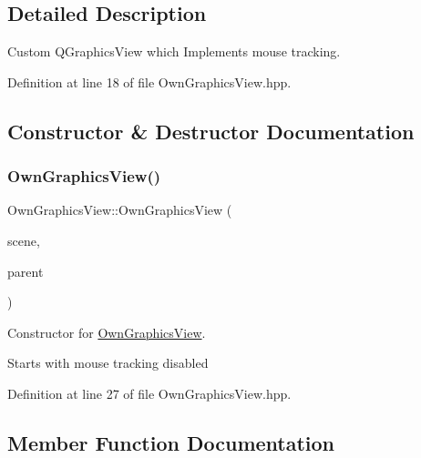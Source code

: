 \subsection{Detailed Description}
Custom Q\+Graphics\+View which Implements mouse tracking. 

Definition at line 18 of file Own\+Graphics\+View.\+hpp.



\subsection{Constructor \& Destructor Documentation}
\mbox{\label{classOwnGraphicsView_a57f2f9617077ce2a1d30ec3f6c7144db}} 
\subsubsection{\texorpdfstring{Own\+Graphics\+View()}{OwnGraphicsView()}}
{\footnotesize\ttfamily Own\+Graphics\+View\+::\+Own\+Graphics\+View (\begin{DoxyParamCaption}\item[{Q\+Graphics\+Scene $\ast$}]{scene,  }\item[{Q\+Widget $\ast$}]{parent }\end{DoxyParamCaption})\hspace{0.3cm}{\ttfamily [inline]}}



Constructor for \mbox{\hyperlink{classOwnGraphicsView}{Own\+Graphics\+View}}. 

Starts with mouse tracking disabled 

Definition at line 27 of file Own\+Graphics\+View.\+hpp.



\subsection{Member Function Documentation}
\mbox{\label{classOwnGraphicsView_a4902ca3c748bc13040c4d869bf7be291}} 
